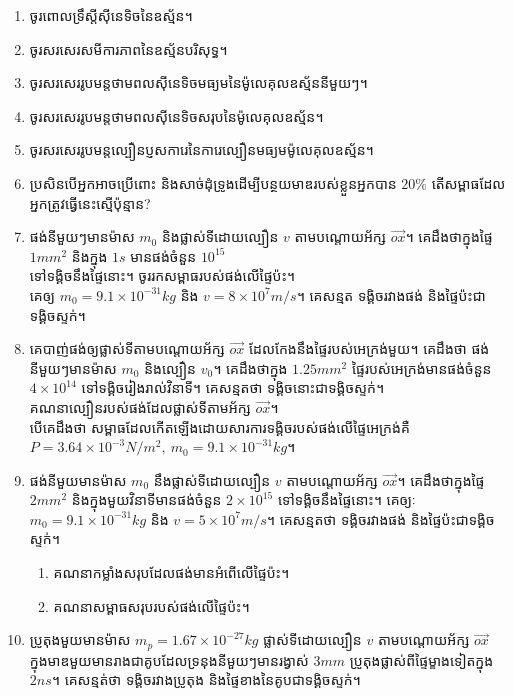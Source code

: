 \documentclass[12pt, a4paper]{article}
\begin{document}
\maketitle\koc
\begin{enumerate}[m]
	\item ចូរពោលទ្រឹស្តីសុីនេទិចនៃឧស្ម័ន។
	\item ចូរសរសេរសមីការភាពនៃឧស្ម័នបរិសុទ្ធ។
	\item ចូរសរសេររូបមន្តថាមពលសុីនេទិចមធ្យមនៃម៉ូលេគុលឧស្ម័ននីមួយៗ។
	\item ចូរសរសេររូបមន្តថាមពលសុីនេទិចសរុបនៃម៉ូលេគុលឧស្ម័ន។
	\item ចូរសរសេររូបមន្តល្បឿនប្ញសការេនៃការេល្បឿនមធ្យមម៉ូលេគុលឧស្ម័ន។
	\item ប្រសិនបើអ្នកអាចប្រើពោះ និងសាច់ដុំទ្រូងដើម្បីបន្ថយមាឌរបស់ខ្លួនអ្នកបាន $20\%$ តើសម្ពាធដែលអ្នកត្រូវធ្វើនេះស្មើប៉ុន្មាន?
	\item ផង់នីមួយៗមានម៉ាស $m_{0}$ និងផ្លាស់ទីដោយល្បឿន $v$ តាមបណ្តោយអ័ក្ស $\overrightarrow{ox}$។ គេដឹងថាក្នុងផ្ទៃ $1mm^{2}$ និងក្នុង $1s$ មានផង់ចំនួន $10^{15}$ \\ទៅទង្គិចនឹងផ្ទៃនោះ។
	ចូររកសម្ពាធរបស់ផង់លើផ្ទៃប៉ះ។\\
	គេឲ្យ $m_{0}=9.1\times10^{-31}kg$ និង $v=8\times10^{7}m/s$។ គេសន្មត ទង្គិចរវាងផង់ និងផ្ទៃប៉ះជាទង្គិចស្ទក់។
	\item គេបាញ់ផង់ឲ្យផ្លាស់ទីតាមបណ្តោយអ័ក្ស $\overrightarrow{ox}$ ដែលកែងនឹងផ្ទៃរបស់អេក្រង់មួយ។ គេដឹងថា ផង់នីមួយៗមានម៉ាស $m_{0}$ និងល្បឿន $v_{0}$។ គេដឹងថាក្នុង $1.25mm^{2}$ ផ្ទៃរបស់អេក្រង់មានផង់ចំនួន $4\times10^{14}$ ទៅទង្គិចរៀងរាល់វិនាទី។ គេសន្មតថា ទង្គិចនោះជាទង្គិចស្ទក់។\\ គណនាល្បឿនរបស់ផង់ដែលផ្លាស់ទីតាមអ័ក្ស $\overrightarrow{ox}$។\\ បើគេដឹងថា សម្ពាធដែលកើតឡើងដោយសារការទង្គិចរបស់ផង់លើផ្ទៃអេក្រង់គឺ $P=3.64\times10^{-3}N/m^{2},~m_{0}=9.1\times10^{-31}kg$។
	\item ផង់នីមួយមានម៉ាស $m_{0}$ នឹងផ្លាស់ទីដោយល្បឿន $v$ តាមបណ្តោយអ័ក្ស $\overrightarrow{ox}$។ គេដឹងថាក្នុងផ្ទៃ $2mm^{2}$ និងក្នុងមួយវិនាទីមានផង់ចំនួន $2\times10^{15}$ ទៅទង្គិចនឹងផ្ទៃនោះ។ គេឲ្យៈ $m_{0}=9.1\times10^{-31}kg$ និង $v=5\times10^{7}m/s$។ គេសន្មតថា ទង្គិចរវាងផង់ និងផ្ទៃប៉ះជាទង្គិចស្ទក់។
	\begin{enumerate}[k,2]
		\item គណនាកម្លាំងសរុបដែលផង់មានអំពើលើផ្ទៃប៉ះ។
		\item គណនាសម្ពាធសរុបរបស់ផង់លើផ្ទៃប៉ះ។
	\end{enumerate}
	\item ប្រូតុងមួយមានម៉ាស $m_{p}=1.67\times10^{-27}kg$ ផ្លាស់ទីដោយល្បឿន $v$ តាមបណ្តោយអ័ក្ស $\overrightarrow{ox}$ ក្នុងមាឌមួយមានរាងជាគូបដែលទ្រនុងនីមួយៗមានរង្វាស់ $3mm$ ប្រូតុងផ្លាស់ពីផ្ទៃម្ខាងទៀតក្នុង $2ns$។ គេសន្មត់ថា ទង្គិចរវាងប្រូតុង និងផ្ទៃខាងនៃគូបជាទង្គិចស្ទក់។

\end{enumerate}
\end{document}
